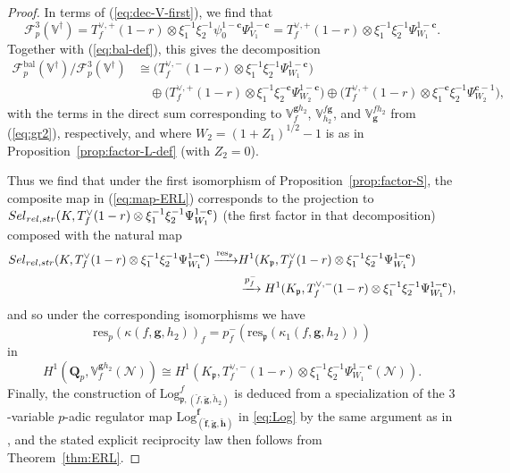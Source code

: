\documentclass[10pt,letterpaper]{amsart}
\theoremstyle{plain}
\theoremstyle{definition}
\theoremstyle{definition}
\theoremstyle{plain}
\theoremstyle{plain}
\theoremstyle{plain}
\theoremstyle{remark}
\numberwithin{equation}{section}
\newcommand{\cc}{\mathbf{c}}
\newcommand{\ch}{\xi}
\newcommand{\Sel}{Sel}
\newcommand{\rH}{H}
\newcommand{\pp}{\mathfrak{p}}
\newcommand{\relstr}{{{\rm rel},{\rm str}}}
\DeclareMathOperator{\bal}{\mathrm{bal}}
\newcommand{\VVdag}{{\mathbb{V}^\dagger}}
\newcommand{\Q}{\mathbf{Q}}
\def\Sel{{\rm Sel}}
\newcommand{\bff}{{\boldsymbol{f}}}
\newcommand{\bfg}{{\boldsymbol{g}}}
\newcommand{\bfh}{{\boldsymbol{h}}}
\begin{document}
\begin{proof}
In terms of (\ref{eq:dec-V-first}), we find that 
\[
\mathscr{F}_p^3(\VVdag)=T_f^{\vee,+}(1-r)\otimes\ch_1^{-1}\ch_2^{-1}\psi_0^{1-\cc}\Psi_{V_1}^{1-\cc}
=T_f^{\vee,+}(1-r)\otimes\ch_1^{-1}\ch_2^{-1}\Psi_{W_1}^{1-\cc}.
\] 
Together with (\ref{eq:bal-def}), this gives the decomposition
\begin{align*}
\mathscr{F}_p^{\bal}(\VVdag)/\mathscr{F}_p^3(\VVdag)&\cong
\bigl(T_f^{\vee,-}(1-r)\otimes\ch_1^{-1}\ch_2^{-1}\Psi_{W_1}^{1-\cc}\bigr)\\
&\quad\oplus\bigl(T_f^{\vee,+}(1-r)\otimes\ch_1^{-1}\ch_2^{-\cc}\Psi_{W_2}^{1-\cc}\bigr)\oplus\bigl(T_f^{\vee,+}(1-r)\otimes\ch_1^{-\cc}\ch_2^{-1}\Psi_{W_2}^{\cc-1}\bigr),
\end{align*}
with the terms in the direct sum corresponding to $\mathbb{V}_{f}^{\bfg h_2}$, $\mathbb{V}_{h_2}^{f\bfg}$, and $\mathbb{V}_{\bfg}^{fh_2}$ from (\ref{eq:gr2}), respectively, and where $W_2=(1+Z_1)^{1/2}-1$ is as in Proposition~\ref{prop:factor-L-def} (with $Z_2=0$).

Thus we find that under the first isomorphism of Proposition~\ref{prop:factor-S}, the composite map in (\ref{eq:map-ERL}) corresponds to the projection to $\Sel_{\relstr}(K,T_f^{\vee}(1-r)\otimes\ch_1^{-1}\ch_2^{-1}\Psi_{W_1}^{1-\cc})$ (the first factor in that decomposition) composed with the natural map
\begin{align*}
\Sel_{\relstr}(K,T_f^{\vee}(1-r)\otimes\ch_1^{-1}\ch_2^{-1}\Psi_{W_1}^{1-\cc})\xrightarrow{{\mathrm{res}}_\pp}
&\rH^1(K_\pp,T_f^{\vee}(1-r)\otimes\ch_1^{-1}\ch_2^{-1}\Psi_{W_1}^{1-\cc})\\
&\xrightarrow{p_f^-}
\rH^1(K_\pp,T_f^{\vee,-}(1-r)\otimes\ch_1^{-1}\ch_2^{-1}\Psi_{W_1}^{1-\cc}),
\end{align*}
and so under the corresponding isomorphisms we have \[{\mathrm{res}}_p(\kappa(f,\bfg,h_2))_f=p_f^-({\mathrm{res}}_\pp(\kappa_1(f,\bfg,h_2)))\] in
\[
\rH^1(\Q_p,\mathbb{V}_f^{\bfg h_2}(\mathscr{N}))\cong\rH^1(K_\pp,T_f^{\vee,-}(1-r)\otimes\ch_1^{-1}\ch_2^{-1}\Psi_{W_1}^{1-\cc}(\mathscr{N})).
\] 
Finally, the construction of ${\mathrm{Log}}^f_{\pp,(\breve{f},\breve{\bfg},\breve{h}_2)}$ is deduced from a specialization of the $3$-variable $p$-adic regulator map ${\mathrm{Log}}^{\bff}_{(\breve{\bff},\breve{\bfg},\breve{\bfh})}$ in \eqref{eq:Log} by the same argument as in \cite[Prop.~7.3]{ACR}, and the stated explicit reciprocity law then follows from Theorem~\ref{thm:ERL}.
\end{proof}
\end{document}
